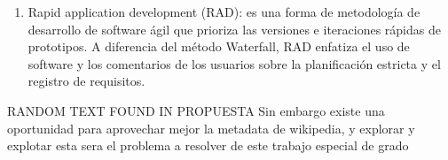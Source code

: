 \begin{enumerate}
        \item Rapid application development (RAD):  es una forma de metodología de desarrollo de software ágil que prioriza las versiones e iteraciones rápidas de prototipos. A diferencia del método Waterfall, RAD enfatiza el uso de software y los comentarios de los usuarios sobre la planificación estricta y el registro de requisitos.
    \end{enumerate}



RANDOM TEXT FOUND IN PROPUESTA
    Sin embargo existe una oportunidad para aprovechar mejor la metadata de wikipedia, y explorar y explotar esta sera el problema a resolver de este trabajo especial de grado
